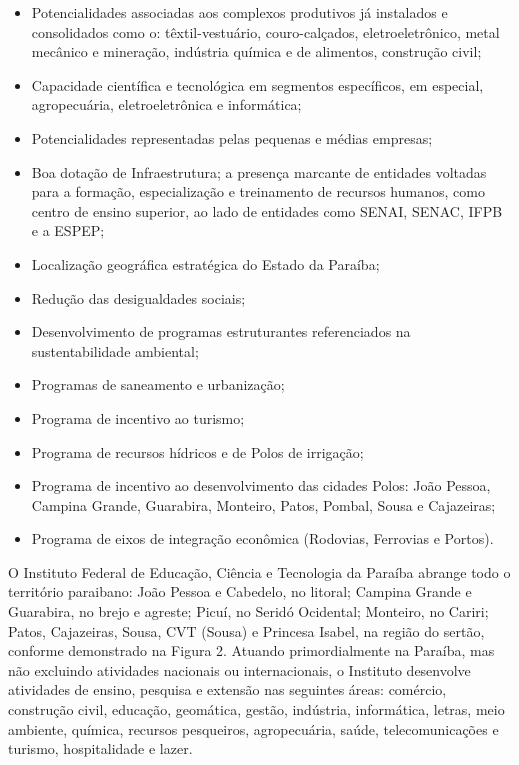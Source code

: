 \begin{itemize}
	\item 	Potencialidades associadas aos complexos produtivos já instalados e consolidados como o: têxtil-vestuário, couro-calçados, eletroeletrônico, metal mecânico 	 	e mineração, indústria química e de alimentos, construção civil;
	\item 	Capacidade científica e tecnológica em segmentos específicos, em especial, agropecuária, eletroeletrônica e informática;
	\item 	Potencialidades representadas pelas pequenas e médias empresas;
	\item 	Boa dotação de Infraestrutura; a presença marcante de entidades voltadas para a formação, especialização e treinamento de recursos humanos, como centro de 		ensino superior, ao lado de entidades como SENAI, SENAC, IFPB e a ESPEP;
	\item 	Localização geográfica estratégica do Estado da Paraíba;
	\item 	Redução das desigualdades sociais;
	\item 	Desenvolvimento de programas estruturantes referenciados na sustentabilidade ambiental;
	\item 	Programas de saneamento e urbanização;
	\item 	Programa de incentivo ao turismo;
	\item 	Programa de recursos hídricos e de Polos de irrigação;
	\item 	Programa de incentivo ao desenvolvimento das cidades Polos: João Pessoa, Campina Grande, Guarabira, Monteiro, Patos, Pombal, Sousa e Cajazeiras;
	\item 	Programa de eixos de integração econômica (Rodovias, Ferrovias e Portos).
\end{itemize}

	O Instituto Federal de Educação, Ciência e Tecnologia da Paraíba abrange todo o território paraibano: João Pessoa e Cabedelo, no litoral; Campina Grande e Guarabira, no brejo e agreste; Picuí, no Seridó Ocidental; Monteiro, no Cariri; Patos, Cajazeiras, Sousa, CVT (Sousa) e Princesa Isabel, na região do sertão, conforme demonstrado na Figura 2. Atuando primordialmente na Paraíba, mas não excluindo atividades nacionais ou internacionais, o Instituto desenvolve atividades de ensino, pesquisa e extensão nas seguintes áreas: comércio, construção civil, educação, geomática, gestão, indústria, informática, letras, meio ambiente, química, recursos pesqueiros, agropecuária, saúde, telecomunicações e turismo, hospitalidade e lazer.

